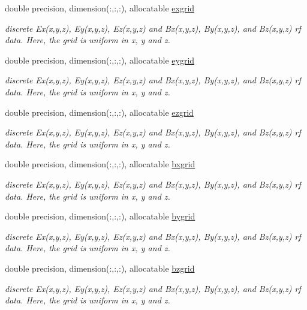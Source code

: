 \textbf{ }\par
\begin{DoxyCompactItemize}
\item 
double precision, dimension(\+:,\+:,\+:), allocatable \mbox{\hyperlink{namespacedataclass_a3379b2d98107a6908aabb71e53031c00}{exgrid}}
\begin{DoxyCompactList}\small\item\em discrete Ex(x,y,z), Ey(x,y,z), Ez(x,y,z) and Bx(x,y,z), By(x,y,z), and Bz(x,y,z) rf data. Here, the grid is uniform in x, y and z. \end{DoxyCompactList}\item 
double precision, dimension(\+:,\+:,\+:), allocatable \mbox{\hyperlink{namespacedataclass_a85c21f161fb74970fc84639092c193dd}{eygrid}}
\begin{DoxyCompactList}\small\item\em discrete Ex(x,y,z), Ey(x,y,z), Ez(x,y,z) and Bx(x,y,z), By(x,y,z), and Bz(x,y,z) rf data. Here, the grid is uniform in x, y and z. \end{DoxyCompactList}\item 
double precision, dimension(\+:,\+:,\+:), allocatable \mbox{\hyperlink{namespacedataclass_aff9491f2e1258faccd2530eace979c78}{ezgrid}}
\begin{DoxyCompactList}\small\item\em discrete Ex(x,y,z), Ey(x,y,z), Ez(x,y,z) and Bx(x,y,z), By(x,y,z), and Bz(x,y,z) rf data. Here, the grid is uniform in x, y and z. \end{DoxyCompactList}\item 
double precision, dimension(\+:,\+:,\+:), allocatable \mbox{\hyperlink{namespacedataclass_ad10657f6c8e764ba3c355bd0e2c98a01}{bxgrid}}
\begin{DoxyCompactList}\small\item\em discrete Ex(x,y,z), Ey(x,y,z), Ez(x,y,z) and Bx(x,y,z), By(x,y,z), and Bz(x,y,z) rf data. Here, the grid is uniform in x, y and z. \end{DoxyCompactList}\item 
double precision, dimension(\+:,\+:,\+:), allocatable \mbox{\hyperlink{namespacedataclass_aa12722da71ea440ed769b715936c87a3}{bygrid}}
\begin{DoxyCompactList}\small\item\em discrete Ex(x,y,z), Ey(x,y,z), Ez(x,y,z) and Bx(x,y,z), By(x,y,z), and Bz(x,y,z) rf data. Here, the grid is uniform in x, y and z. \end{DoxyCompactList}\item 
double precision, dimension(\+:,\+:,\+:), allocatable \mbox{\hyperlink{namespacedataclass_aabd84b55c65371356291620ee4dceb06}{bzgrid}}
\begin{DoxyCompactList}\small\item\em discrete Ex(x,y,z), Ey(x,y,z), Ez(x,y,z) and Bx(x,y,z), By(x,y,z), and Bz(x,y,z) rf data. Here, the grid is uniform in x, y and z. \end{DoxyCompactList}\end{DoxyCompactItemize}

